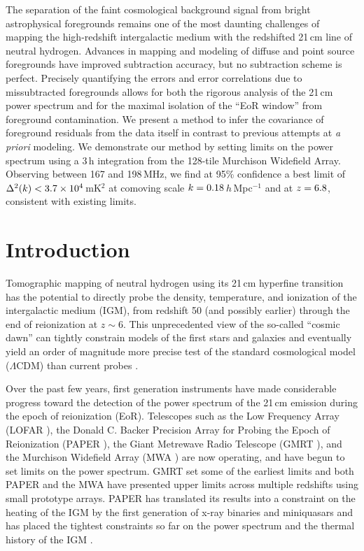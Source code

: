 The separation of the faint cosmological background signal from bright astrophysical foregrounds remains one of the most daunting challenges of mapping the high-redshift intergalactic medium with the redshifted 21\,cm line of neutral hydrogen. Advances in mapping and modeling of diffuse and point source foregrounds have improved subtraction accuracy, but no subtraction scheme is perfect.  Precisely quantifying the errors and error correlations due to missubtracted foregrounds allows for both the rigorous analysis of the 21\,cm power spectrum and for the maximal isolation of the ``EoR window'' from foreground contamination. We present a method to infer the covariance of foreground residuals from the data itself in contrast to previous attempts at \textit{a priori} modeling. We demonstrate our method by setting limits on the power spectrum using a 3\,h integration from the 128-tile Murchison Widefield Array. Observing between 167 and 198\,MHz, we find at 95\% confidence a best limit of $\Delta^2(k) < 3.7\times 10^4$\,mK$^2$ at comoving scale $k = 0.18$\,$h$\,Mpc$^{-1}$ and at $z = 6.8$, consistent with existing limits.


\section{Introduction} \label{sec:intro}

Tomographic mapping of neutral hydrogen using its 21\,cm hyperfine transition has the potential to directly probe the density, temperature, and ionization of the intergalactic medium (IGM), from redshift 50 (and possibly earlier) through the end of reionization at $z\sim 6$. This unprecedented view of the so-called ``cosmic dawn'' can tightly constrain models of the first stars and galaxies \cite{FurlanettoReview, miguelreview, PritchardLoebReview, aviBook} and eventually yield an order of magnitude more precise test of the standard cosmological model ($\Lambda$CDM) than current probes \cite{mao08}. 

Over the past few years, first generation instruments have made considerable progress toward the detection of the power spectrum of the 21\,cm emission during the epoch of reionization (EoR). Telescopes such as the Low Frequency Array (LOFAR \cite{LOFARinstrument}), the Donald C. Backer Precision Array for Probing the Epoch of Reionization (PAPER \cite{parsons14}), the Giant Metrewave Radio Telescope (GMRT \cite{gmrtsignalloss}), and the Murchison Widefield Array (MWA \cite{lonsdale09,tingay13,mwascience}) are now operating, and have begun to set limits on the power spectrum. GMRT set some of the earliest limits \cite{gmrtsignalloss} and both PAPER \cite{DannyMultiRedshift} and the MWA \cite{X13} have presented upper limits across multiple redshifts using small prototype arrays. PAPER has translated its results into a constraint on the heating of the IGM by the first generation of x-ray binaries and miniquasars \cite{parsons14} and has placed the tightest constraints so far on the power spectrum \cite{ali15} and the thermal history of the IGM \cite{PoberPAPER64Heating}.

